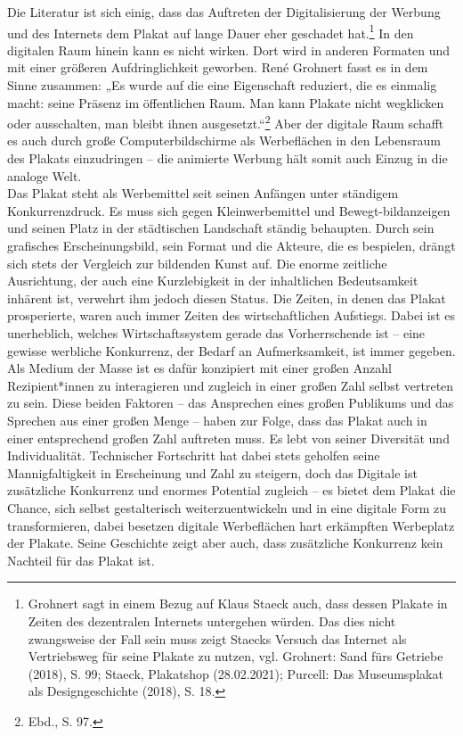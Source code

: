 \documentclass[a4paper,12pt,ngerman]{article}
\begin{document}
Die Literatur ist sich einig, dass das Auftreten der Digitalisierung der Werbung und des Internets dem Plakat auf lange Dauer eher geschadet hat.\footnote{Grohnert sagt in einem Bezug auf Klaus Staeck auch, dass dessen Plakate in Zeiten des dezentralen Internets untergehen würden. Das dies nicht zwangsweise der Fall sein muss zeigt Staecks Versuch das Internet als Vertriebsweg für seine Plakate zu nutzen, vgl. Grohnert: Sand fürs Getriebe (2018), S. 99; Staeck, Plakatshop (28.02.2021); Purcell: Das Museumsplakat als Designgeschichte (2018), S. 18.}  In den digitalen Raum hinein kann es nicht wirken. Dort wird in anderen Formaten und mit einer größeren Aufdringlichkeit geworben. René Grohnert fasst es in dem Sinne zusammen: „Es wurde auf die eine Eigenschaft reduziert, die es einmalig macht: seine Präsenz im öffentlichen Raum. Man kann Plakate nicht wegklicken oder ausschalten, man bleibt ihnen ausgesetzt.“\footnote{Ebd., S. 97.}  Aber der digitale Raum schafft es auch durch große Computerbildschirme als Werbeflächen in den Lebensraum des Plakats einzudringen – die animierte Werbung hält somit auch Einzug in die analoge Welt. \\
Das Plakat steht als Werbemittel seit seinen Anfängen unter ständigem Konkurrenzdruck. Es muss sich gegen Kleinwerbemittel und Bewegt-bildanzeigen und seinen Platz in der städtischen Landschaft ständig behaupten. Durch sein grafisches Erscheinungsbild, sein Format und die Akteure, die es bespielen, drängt sich stets der Vergleich zur bildenden Kunst auf. Die enorme zeitliche Ausrichtung, der auch eine Kurzlebigkeit in der inhaltlichen Bedeutsamkeit inhärent ist, verwehrt ihm jedoch diesen Status. Die Zeiten, in denen das Plakat prosperierte, waren auch immer Zeiten des wirtschaftlichen Aufstiegs. Dabei ist es unerheblich, welches Wirtschaftssystem gerade das Vorherrschende ist – eine gewisse werbliche Konkurrenz, der Bedarf an Aufmerksamkeit, ist immer gegeben. Als Medium der Masse ist es dafür konzipiert mit einer großen Anzahl Rezipient*innen zu interagieren und zugleich in einer großen Zahl selbst vertreten zu sein. Diese beiden Faktoren – das Ansprechen eines großen Publikums und das Sprechen aus einer großen Menge – haben zur Folge, dass das Plakat auch in einer entsprechend großen Zahl auftreten muss. Es lebt von seiner Diversität und Individualität. Technischer Fortschritt hat dabei stets geholfen seine Mannigfaltigkeit in Erscheinung und Zahl zu steigern, doch das Digitale ist zusätzliche Konkurrenz und enormes Potential zugleich – es bietet dem Plakat die Chance, sich selbst gestalterisch weiterzuentwickeln und in eine digitale Form zu transformieren, dabei besetzen digitale Werbeflächen hart erkämpften Werbeplatz der Plakate. Seine Geschichte zeigt aber auch, dass zusätzliche Konkurrenz kein Nachteil für das Plakat ist.
\end{document}

